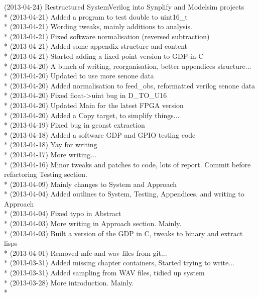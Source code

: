 (2013-04-24) Restructured SystemVerilog into Synplify and Modelsim projects \\*
(2013-04-21) Added a program to test double to uint16\_t \\*
(2013-04-21) Wording tweaks, mainly additions to analysis. \\*
(2013-04-21) Fixed software normalisation (reversed subtraction) \\*
(2013-04-21) Added some appendix structure and content \\*
(2013-04-21) Started adding a fixed point version to GDP-in-C \\*
(2013-04-20) A bunch of writing, reorganisation, better appendices structure... \\*
(2013-04-20) Updated to use more senone data \\*
(2013-04-20) Added normalisation to feed\_obs, reformatted verilog senone data \\*
(2013-04-20) Fixed float->uint bug in D\_TO\_U16 \\*
(2013-04-20) Updated Main for the latest FPGA version \\*
(2013-04-20) Added a Copy target, to simplify things... \\*
(2013-04-19) Fixed bug in gconst extraction \\*
(2013-04-18) Added a software GDP and GPIO testing code \\*
(2013-04-18) Yay for writing \\*
(2013-04-17) More writing... \\*
(2013-04-16) Minor tweaks and patches to code, lots of report. Commit before refactoring Testing section. \\*
(2013-04-09) Mainly changes to System and Approach \\*
(2013-04-04) Added outlines to System, Testing, Appendices, and writing to Approach \\*
(2013-04-04) Fixed typo in Abstract \\*
(2013-04-03) More writing in Approach section. Mainly. \\*
(2013-04-03) Built a version of the GDP in C, tweaks to binary and extract lisps \\*
(2013-04-01) Removed mfc and wav files from git... \\*
(2013-03-31) Added missing chapter containers, Started trying to write... \\*
(2013-03-31) Added sampling from WAV files, tidied up system \\*
(2013-03-28) More introduction. Mainly. \\*

